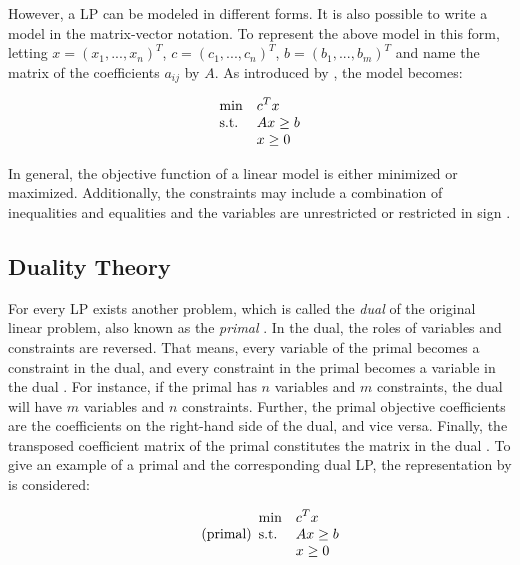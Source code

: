 However, a LP can be modeled in different forms. It is also possible 
to write a model in the matrix-vector notation. To represent the above model in this form, letting
$x=(x_{1}, ..., x_{n})^{T}$, $c=(c_{1}, ..., c_{n})^{T}$, $b=(b_{1}, ..., b_{m})^{T}$
and name the matrix of the coefficients $a_{ij}$ by $A$. As introduced by ,
the model becomes:

\begin{equation*}
    \begin{array}{ll@{}ll}
        \text{min}  & \displaystyle c^{T}x &\\
        \text{s.t.}& \displaystyle Ax \geq b&\\
                    &                        x \geq 0
    \end{array}
\end{equation*}

\clearpage
In general, the objective function of a linear model is either minimized or maximized.
Additionally, the constraints may include a combination of inequalities and equalities
and the variables are unrestricted or restricted in sign .

\subsection{Duality Theory}
\label{sec:duality_theory}
For every LP exists another problem, which
is called the \textit{dual} of the original linear problem, also known as the 
\textit{primal} .
In the dual, the roles of variables and constraints are reversed. 
That means, every variable of the primal becomes a constraint in the dual,
and every constraint in the primal becomes a variable in 
the dual .
For instance, if the primal has $n$ variables and $m$ constraints, the dual
will have $m$ variables and $n$ constraints. Further, the primal objective coefficients 
are the coefficients on the right-hand side of 
the dual, and vice versa.
Finally, the transposed coefficient matrix of the primal constitutes the matrix in the 
dual .
To give an example of a primal and the corresponding dual LP,
the representation by  is considered:

\begin{equation}
    \tag{primal}
    \begin{array}{ll@{}ll}
        \text{min}  & \displaystyle c^{T}x &\\
        \text{s.t.}& \displaystyle Ax \geq b  &\\
                    &                        x \geq 0
    \end{array}
\end{equation}

